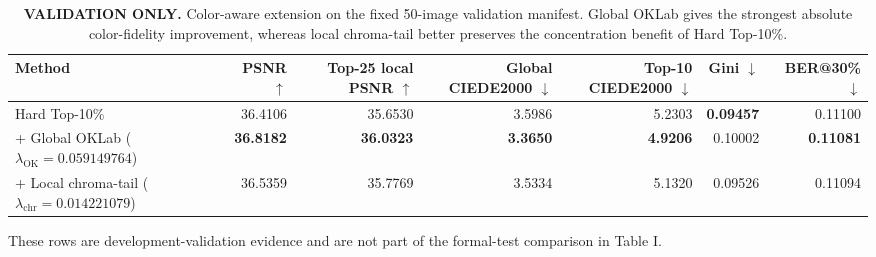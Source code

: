 \begin{table}[t]
  \centering
  \caption{\textbf{VALIDATION ONLY.} Color-aware extension on the fixed 50-image validation manifest. Global OKLab gives the strongest absolute color-fidelity improvement, whereas local chroma-tail better preserves the concentration benefit of Hard Top-10\%.}
  \label{tab:color_extension}
  \scriptsize
  \setlength{\tabcolsep}{3.5pt}
  \renewcommand{\arraystretch}{1.10}
  \begin{tabular*}{\textwidth}{@{\extracolsep{\fill}}lrrrrrr@{}}
    \toprule
    Method & PSNR $\uparrow$ & Top-25 local PSNR $\uparrow$ & Global CIEDE2000 $\downarrow$ & Top-10 CIEDE2000 $\downarrow$ & Gini $\downarrow$ & BER@30\% $\downarrow$ \\
    \midrule
    Hard Top-10\% & 36.4106 & 35.6530 & 3.5986 & 5.2303 & \textbf{0.09457} & 0.11100 \\
    \quad + Global OKLab ($\lambda_{\mathrm{OK}}=0.059149764$) & \textbf{36.8182} & \textbf{36.0323} & \textbf{3.3650} & \textbf{4.9206} & 0.10002 & \textbf{0.11081} \\
    \quad + Local chroma-tail ($\lambda_{\mathrm{chr}}=0.014221079$) & 36.5359 & 35.7769 & 3.5334 & 5.1320 & 0.09526 & 0.11094 \\
    \bottomrule
  \end{tabular*}
  \vspace{2pt}
  \parbox{\textwidth}{\scriptsize These rows are development-validation evidence and are not part of the formal-test comparison in Table I.}
\end{table}
